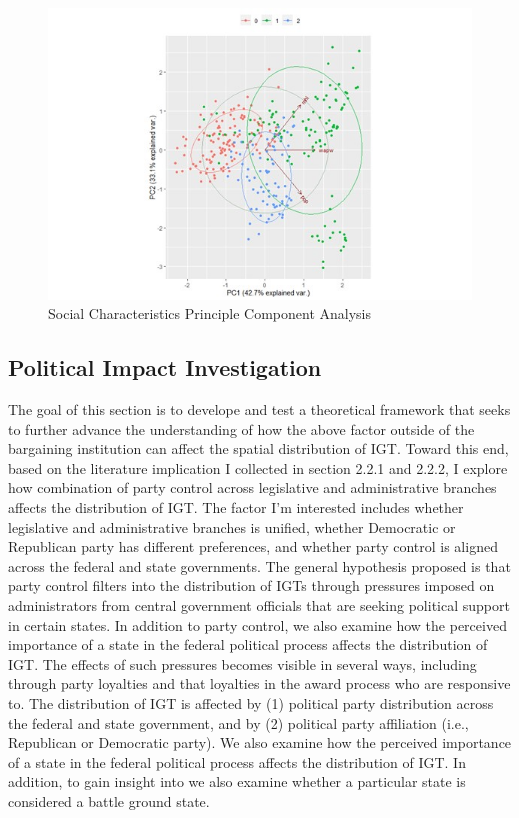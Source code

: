 \begin{figure}[H]
  \centering
  \includegraphics[scale=1]{Chapter-2/Figures/pca.jpg}
  \caption[Social Characteristics Principle components Analysis]{Social Characteristics Principle Component Analysis
  \texttt{} }
  \label{Figure 2.2}
\end{figure}



\subsection{Political Impact Investigation}
The goal of this section is to  develope and test a theoretical framework that seeks to further advance the understanding of how the above factor outside of the bargaining institution can affect the spatial distribution of IGT. Toward this end, based on the literature implication I collected in section 2.2.1 and 2.2.2, I explore how combination of party control across legislative and administrative branches affects the distribution of IGT. The factor I'm interested includes whether legislative and administrative branches is unified, whether Democratic or Republican party has different preferences, and whether party control is aligned across the federal and state governments.
The general hypothesis proposed is that party control filters into the distribution of IGTs through pressures imposed on administrators from central government officials that are seeking political support in certain states. In addition to party control, we also examine how the perceived importance of a state in the federal political process affects the distribution of IGT. The effects of such pressures becomes visible in several ways, including through party loyalties and that loyalties in the award process who are responsive to. The distribution of IGT is affected by (1) political party distribution across the federal and state government, and by (2) political party affiliation (i.e., Republican or Democratic party). We also examine how the perceived importance of a state in the federal political process affects the distribution of IGT. In addition, to gain insight into we also examine whether a particular state is considered a battle ground state.


